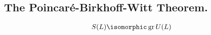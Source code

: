 \subsection{The Poincar\'e-Birkhoff-Witt Theorem.}
\label{sub:the_poincar'e_birkhoff_witt_theorem_}


\begin{theorem}
    \begin{align}
        S(L) \isomorphic \gr U(L)
    \end{align}
\end{theorem}




